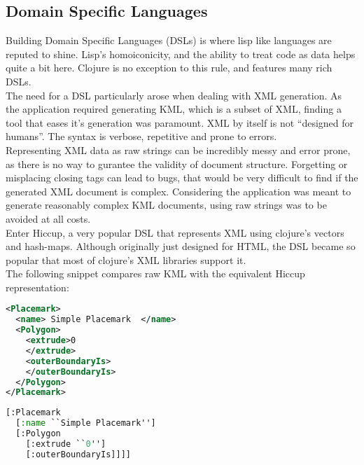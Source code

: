\subsection{Domain Specific Languages}

Building Domain Specific Languages (DSLs) is where lisp like languages are reputed to shine. Lisp's homoiconicity, and the ability to treat code as data helps quite a bit here. Clojure is no exception to this rule, and features many rich DSLs.\\

The need for a DSL particularly arose when dealing with XML generation. As the application required generating KML, which is a subset of XML, finding a tool that eases it's generation was paramount. XML by itself is not ``designed for humans''. The syntax is verbose, repetitive and prone to errors.\\

Representing XML data as raw strings can be incredibly messy and error prone, as there is no way to gurantee the validity of document structure. Forgetting or misplacing closing tags can lead to bugs, that would be very difficult to find if the generated XML document is complex. Considering the application was meant to generate reasonably complex KML documents, using raw strings was to be avoided at all costs.\\

Enter Hiccup, a very popular DSL that represents XML using clojure's vectors and hash-maps. Although originally just designed for HTML, the DSL became so popular that most of clojure's XML libraries support it. \\

The following snippet compares raw KML with the equivalent Hiccup representation:\\

\begin{lstlisting}[language=XML,caption= A simple placemark in raw KML]
<Placemark>
  <name> Simple Placemark  </name>
  <Polygon>
    <extrude>0
    </extrude>
    <outerBoundaryIs>
    </outerBoundaryIs>
  </Polygon>
</Placemark>
\end{lstlisting}

\begin{lstlisting}[language=Lisp, caption= The equivalent placemark with hiccup. Notice the brevity and lack of repetition]
[:Placemark
  [:name ``Simple Placemark'']
  [:Polygon
    [:extrude ``0'']
    [:outerBoundaryIs]]]]
\end{lstlisting}

